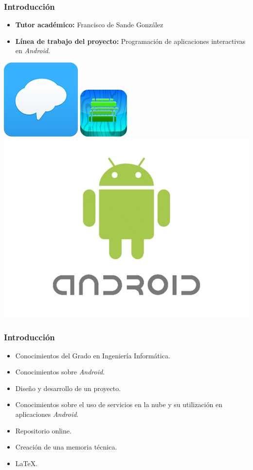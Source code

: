 \begin{frame}
    \frametitle{Introducción}
    \begin{itemize}
	\item \textbf{Tutor académico:} Francisco de Sande González
        \item \textbf{Línea de trabajo del proyecto:} Programación de aplicaciones interactivas en {\it Android}.
    \end{itemize}
        {\inserttitlegraphic\par}
		\vfill \includegraphics[width=0.2\linewidth]{Images/logos/remind_logo_2}
		\hfill %
		\includegraphics[width=0.2\linewidth]{Images/logos/schoolApp}
		\hfill \includegraphics[width=0.35\linewidth]{Images/logos/android_logo}
\end{frame}
\begin{frame}
	\frametitle{Introducción}
		\begin{itemize}
			\item Conocimientos del Grado en Ingeniería Informática.
			\item Conocimientos sobre {\it Android}.
			\item Diseño y desarrollo de un proyecto.
			\item Conocimientos sobre el uso de servicios en la nube y su utilización en aplicaciones {\it Android}.
			\item Repositorio online.
			\item Creación de una memoria técnica.
			\item \LaTeX{}.
		\end{itemize}
	\endblock{}
\end{frame}
